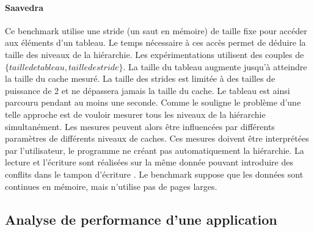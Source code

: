         \paragraph{Saavedra \cite{Saavedra1995}} 
        
            Ce benchmark utilise une \gls{stride} (un saut en mémoire) de taille fixe pour accéder aux éléments d'un tableau. Le temps nécessaire à ces accès permet de déduire la taille des niveaux de la hiérarchie. Les expérimentations utilisent des couples de $\{taille de tableau, taille de stride\}$. La taille du tableau augmente jusqu'à atteindre la taille du cache mesuré. La taille des strides est limitée à des tailles de puissance de 2 et ne dépassera jamais la taille du cache. Le tableau est ainsi parcouru pendant au moins une seconde. Comme le souligne \cite{Yotov2005} le problème d'une telle approche est de vouloir mesurer tous les niveaux de la hiérarchie simultanément. Les mesures peuvent alors être influencées par différents paramètres de différents niveaux de caches. Ces mesures doivent être interprétées par l'utilisateur, le programme ne créant pas automatiquement la hiérarchie. La lecture et l'écriture sont réalisées sur la même donnée pouvant introduire des conflits dans le tampon d'écriture \cite{Yotov2005}. Le benchmark suppose que les données sont continues en mémoire, mais n'utilise pas de pages larges.

       
\subsection{Analyse de performance d'une application}\label{sec:profiling}

